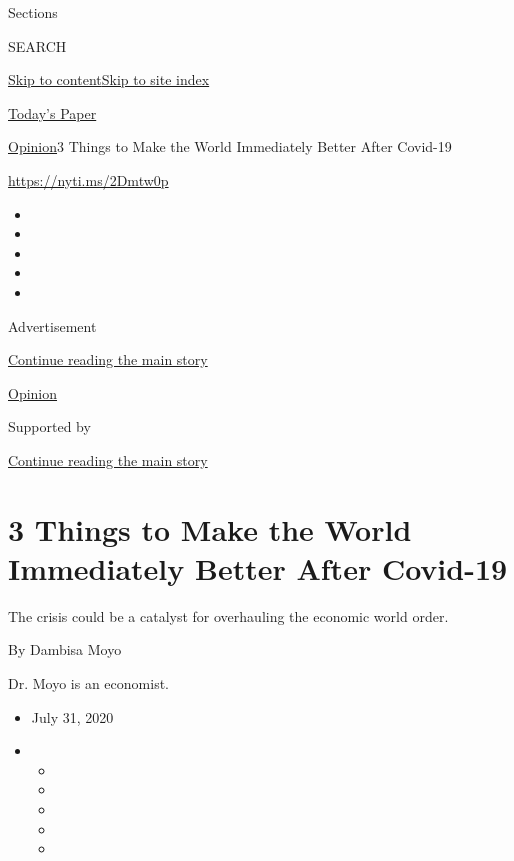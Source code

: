Sections

SEARCH

\protect\hyperlink{site-content}{Skip to
content}\protect\hyperlink{site-index}{Skip to site index}

\href{https://myaccount.nytimes.com/auth/login?response_type=cookie\&client_id=vi}{}

\href{https://www.nytimes.com/section/todayspaper}{Today's Paper}

\href{/section/opinion}{Opinion}\textbar{}3 Things to Make the World
Immediately Better After Covid-19

\url{https://nyti.ms/2Dmtw0p}

\begin{itemize}
\item
\item
\item
\item
\item
\end{itemize}

Advertisement

\protect\hyperlink{after-top}{Continue reading the main story}

\href{/section/opinion}{Opinion}

Supported by

\protect\hyperlink{after-sponsor}{Continue reading the main story}

\hypertarget{3-things-to-make-the-world-immediately-better-after-covid-19}{%
\section{3 Things to Make the World Immediately Better After
Covid-19}\label{3-things-to-make-the-world-immediately-better-after-covid-19}}

The crisis could be a catalyst for overhauling the economic world order.

By Dambisa Moyo

Dr. Moyo is an economist.

\begin{itemize}
\item
  July 31, 2020
\item
  \begin{itemize}
  \item
  \item
  \item
  \item
  \item
  \end{itemize}
\end{itemize}

